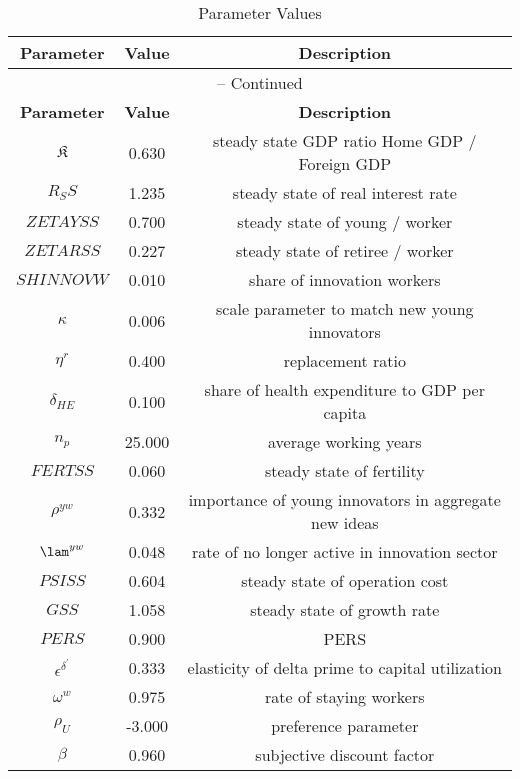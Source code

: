\begin{center}
\begin{longtable}{ccc}
\caption{Parameter Values}\\%
\toprule%
\multicolumn{1}{c}{\textbf{Parameter}} &
\multicolumn{1}{c}{\textbf{Value}} &
 \multicolumn{1}{c}{\textbf{Description}}\\%
\midrule%
\endfirsthead
\multicolumn{3}{c}{{\tablename} \thetable{} -- Continued}\\%
\midrule%
\multicolumn{1}{c}{\textbf{Parameter}} &
\multicolumn{1}{c}{\textbf{Value}} &
  \multicolumn{1}{c}{\textbf{Description}}\\%
\midrule%
\endhead
${\mathfrak{K}}$ 	 & 	 0.630 	 & 	 steady state GDP ratio \: Home GDP / Foreign GDP \\
${R_SS}$ 	 & 	 1.235 	 & 	 steady state of real interest rate\\
${ZETAYSS}$ 	 & 	 0.700 	 & 	 steady state of young / worker \\
${ZETARSS}$ 	 & 	 0.227 	 & 	 steady state of retiree / worker \\
${SHINNOVW}$ 	 & 	 0.010 	 & 	 share of innovation workers\\
${\kappa}$ 	 & 	 0.006 	 & 	 scale parameter to match new young innovators\\
${\eta^r}$ 	 & 	 0.400 	 & 	 replacement ratio\\
${\delta_{HE}}$ 	 & 	 0.100 	 & 	 share of health expenditure to GDP per capita\\
${n_p}$ 	 & 	 25.000 	 & 	 average working years\\
${FERTSS}$ 	 & 	 0.060 	 & 	 steady state of fertility\\
${\rho^{yw}}$ 	 & 	 0.332 	 & 	 importance of young innovators in aggregate new ideas\\
${\lam^{yw}}$ 	 & 	 0.048 	 & 	 rate of no longer active in innovation sector\\
${PSISS}$ 	 & 	 0.604 	 & 	 steady state of operation cost\\
${GSS}$ 	 & 	 1.058 	 & 	 steady state of growth rate\\
$PERS$ 	 & 	 0.900 	 & 	 PERS\\
${\epsilon^{\delta^{\prime}}}$ 	 & 	 0.333 	 & 	 elasticity of delta prime to capital utilization\\
${\omega^w}$ 	 & 	 0.975 	 & 	 rate of staying workers\\
${\rho_U}$ 	 & 	 -3.000 	 & 	 preference parameter\\
${\beta}$ 	 & 	 0.960 	 & 	 subjective discount factor\\

\end{longtable}
\end{center}
